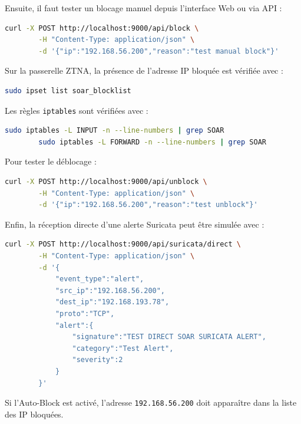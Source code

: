 \documentclass[12pt,a4paper,oneside]{report}
\begin{document}
    Ensuite, il faut tester un blocage manuel depuis l'interface Web ou via API :
    
    \begin{lstlisting}[language=bash]
    	curl -X POST http://localhost:9000/api/block \
    	-H "Content-Type: application/json" \
    	-d '{"ip":"192.168.56.200","reason":"test manual block"}'
    \end{lstlisting}
    
    Sur la passerelle ZTNA, la présence de l'adresse IP bloquée est vérifiée avec :
    
    \begin{lstlisting}[language=bash]
    	sudo ipset list soar_blocklist
    \end{lstlisting}
    
    Les règles \texttt{iptables} sont vérifiées avec :
    
    \begin{lstlisting}[language=bash]
    	sudo iptables -L INPUT -n --line-numbers | grep SOAR
    	sudo iptables -L FORWARD -n --line-numbers | grep SOAR
    \end{lstlisting}
    
    Pour tester le déblocage :
    
    \begin{lstlisting}[language=bash]
    	curl -X POST http://localhost:9000/api/unblock \
    	-H "Content-Type: application/json" \
    	-d '{"ip":"192.168.56.200","reason":"test unblock"}'
    \end{lstlisting}
    
    Enfin, la réception directe d'une alerte Suricata peut être simulée avec :
    
    \begin{lstlisting}[language=bash]
    	curl -X POST http://localhost:9000/api/suricata/direct \
    	-H "Content-Type: application/json" \
    	-d '{
    		"event_type":"alert",
    		"src_ip":"192.168.56.200",
    		"dest_ip":"192.168.193.78",
    		"proto":"TCP",
    		"alert":{
    			"signature":"TEST DIRECT SOAR SURICATA ALERT",
    			"category":"Test Alert",
    			"severity":2
    		}
    	}'
    \end{lstlisting}
    
    Si l'Auto-Block est activé, l'adresse \texttt{192.168.56.200} doit apparaître dans la liste des IP bloquées.
    
\end{document}
